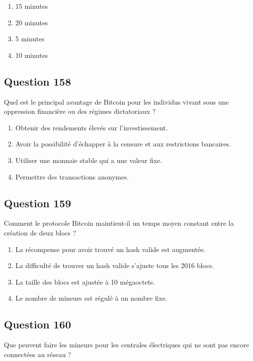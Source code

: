 \documentclass[12pt,a4paper]{article}
\begin{document}
\begin{enumerate}[label=\Alph*., leftmargin=*]
\item 15 minutes
\item 20 minutes
\item 5 minutes
\item 10 minutes
\end{enumerate}

\bigskip


\subsection*{Question 158}
Quel est le principal avantage de Bitcoin pour les individus vivant sous une oppression financière ou des régimes dictatoriaux ?

\begin{enumerate}[label=\Alph*., leftmargin=*]
\item Obtenir des rendements élevés sur l'investissement.
\item Avoir la possibilité d'échapper à la censure et aux restrictions bancaires.
\item Utiliser une monnaie stable qui a une valeur fixe.
\item Permettre des transactions anonymes.
\end{enumerate}

\bigskip


\subsection*{Question 159}
Comment le protocole Bitcoin maintient-il un temps moyen constant entre la création de deux blocs ?

\begin{enumerate}[label=\Alph*., leftmargin=*]
\item La récompense pour avoir trouvé un hash valide est augmentée.
\item La difficulté de trouver un hash valide s'ajuste tous les 2016 blocs.
\item La taille des blocs est ajustée à 10 mégaoctets.
\item Le nombre de mineurs est régulé à un nombre fixe.
\end{enumerate}

\bigskip


\subsection*{Question 160}
Que peuvent faire les mineurs pour les centrales électriques qui ne sont pas encore connectées au réseau ?
\end{document}
